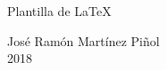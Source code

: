 \begin{titlepage}
\null
{}
\pagestyle{plain}
\vspace{5cm}

\begin{center}
{\Huge  Plantilla de \LaTeX}
\end{center}

\vfill

\begin{flushright}
José Ramón Martínez Piñol\\
2018
\end{flushright}
\end{titlepage}